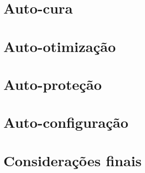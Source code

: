 \documentclass[12pt]{article}
\begin{document}
\section{Auto-cura}
\section{Auto-otimização}
\section{Auto-proteção}
\section{Auto-configuração}
\section{Considerações finais}
\end{document}
